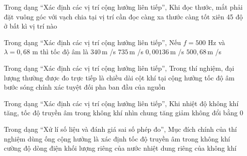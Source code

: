 \begin{ex}
Trong dạng “Xác định các vị trí cộng hưởng liên tiếp”, Khi đọc thước, mắt phải đặt
\choice
{\True vuông góc với vạch chia tại vị trí cần đọc}
{càng xa thước càng tốt}
{xiên 45 độ}
{ở bất kì vị trí nào}
\end{ex}

\begin{ex}
Trong dạng “Xác định các vị trí cộng hưởng liên tiếp”, Nếu $f=500$ Hz và $\lambda=0,68$ m thì tốc độ âm là
\choice
{\True $340\,\text{m}$ /s}
{$735\,\text{m}$ /s}
{$0,00136\,\text{m}$ /s}
{$500,68\,\text{m}$ /s}
\end{ex}

\begin{ex}
Trong dạng “Xác định các vị trí cộng hưởng liên tiếp”, Trong thí nghiệm, đại lượng thường được đo trực tiếp là
\choice
{\True chiều dài cột khí tại cộng hưởng}
{tốc độ âm}
{bước sóng chính xác tuyệt đối}
{pha ban đầu của nguồn}
\end{ex}

\begin{ex}
Trong dạng “Xác định các vị trí cộng hưởng liên tiếp”, Khi nhiệt độ không khí tăng, tốc độ truyền âm trong không khí nhìn chung
\choice
{\True tăng}
{giảm}
{không đổi}
{bằng 0}
\end{ex}

\begin{ex}
Trong dạng “Xử lí số liệu và đánh giá sai số phép đo”, Mục đích chính của thí nghiệm dùng ống cộng hưởng là xác định
\choice
{\True tốc độ truyền âm trong không khí}
{cường độ dòng điện}
{khối lượng riêng của nước}
{nhiệt dung riêng của không khí}
\end{ex}

